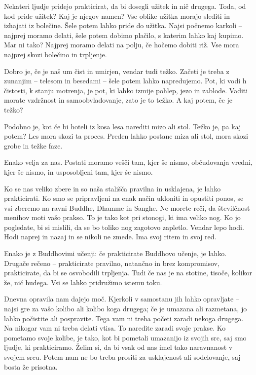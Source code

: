 \clearpage


Nekateri ljudje pridejo prakticirat, da bi dosegli užitek in nič drugega. Toda, od kod pride užitek? Kaj je njegov namen? Vse oblike užitka morajo slediti in izhajati iz bolečine. Šele potem lahko pride do užitka. Najsi počnemo karkoli – najprej moramo delati, šele potem dobimo plačilo, s katerim lahko kaj kupimo. Mar ni tako? Najprej moramo delati na polju, če hočemo dobiti riž. Vse mora najprej skozi bolečino in trpljenje.

\vspace{-\baselineskip}

Dobro je, če je naš um čist in umirjen, vendar tudi težko. Začeti je treba z zunanjim – telesom in besedami – šele potem lahko napredujemo. Pot, ki vodi h čistosti, k stanju motrenja, je pot, ki lahko izmije pohlep, jezo in zablode. Vaditi morate vzdržnost in samoobvladovanje, zato je to težko. A kaj potem, če je težko?

Podobno je, kot če bi hoteli iz kosa lesa narediti mizo ali stol. Težko je, pa kaj potem? Les mora skozi ta proces. Preden lahko postane miza ali stol, mora skozi grobe in težke faze.

Enako velja za nas. Postati moramo vešči tam, kjer še nismo, občudovanja vredni, kjer še nismo, in usposobljeni tam, kjer še nismo.

\clearpage


Ko se nas veliko zbere in so naša stališča pravilna in usklajena, je lahko prakticirati. Ko smo se pripravljeni na enak način ukloniti in opustiti ponos, se vsi zberemo na ravni Buddhe, Dhamme in Sanghe. Ne morete reči, da številčnost menihov moti vašo prakso. To je tako kot pri stonogi, ki ima veliko nog. Ko jo pogledate, bi si mislili, da se bo toliko nog zagotovo zapletlo. Vendar lepo hodi. Hodi naprej in nazaj in se nikoli ne zmede. Ima svoj ritem in svoj red.

Enako je z Buddhovimi učenji: če prakticirate Buddhovo učenje, je lahko. Drugače rečeno – prakticirate pravilno, natančno in brez kompromisov, prakticirate, da bi se osvobodili trpljenja. Tudi če nas je na stotine, tisoče, kolikor že, nič hudega. Vsi se lahko pridružimo istemu toku.

\clearpage


Dnevna opravila nam dajejo moč. Kjerkoli v samostanu jih lahko opravljate – najsi gre za vašo kolibo ali kolibo koga drugega; če je umazana ali razmetana, jo lahko počistite ali pospravite. Tega vam ni treba početi zaradi nekoga drugega. Na nikogar vam ni treba delati vtisa. To naredite zaradi svoje prakse. Ko pometamo svoje kolibe, je tako, kot bi pometali umazanijo iz svojih src, saj smo ljudje, ki prakticiramo. Želim si, da bi vsak od nas imel tako naravnanost v svojem srcu. Potem nam ne bo treba prositi za usklajenost ali sodelovanje, saj bosta že prisotna.


